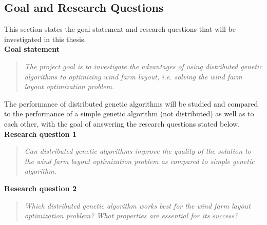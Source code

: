 \documentclass[12pt]{report}
\begin{document}
\subsection{Goal and Research Questions}
This section states the goal statement and research questions that will be investigated in this thesis. \\


\noindent \textbf{Goal statement}


\begin{quote}
\textit{The project goal is to investigate the advantages of using distributed genetic algorithms to optimizing wind farm layout, i.e. solving the wind farm layout optimization problem.}
\end{quote}


\noindent The performance of distributed genetic algorithms will be studied and compared to the performance of a simple genetic algorithm (not distributed) as well as to each other, with the goal of answering the research questions stated below.\\


\noindent \textbf{Research question 1}


\begin{quote}
\textit{Can distributed genetic algorithms improve the quality of the solution to the wind farm layout optimization problem as compared to simple genetic algorithm.}
\end{quote}


\noindent \textbf{Research question 2}


\begin{quote}
\textit{Which distributed genetic algorithm works best for the wind farm layout optimization problem? What properties are essential for its success?}
\end{quote}
\end{document}
